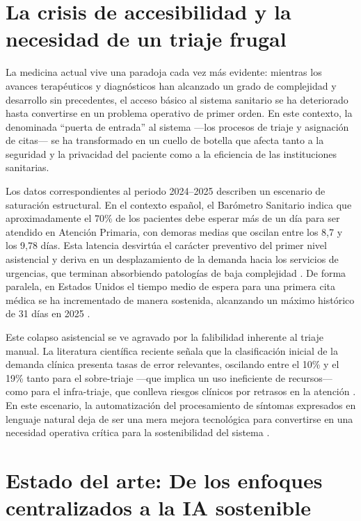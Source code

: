 
\section{La crisis de accesibilidad y la necesidad de un triaje frugal}

La medicina actual vive una paradoja cada vez más evidente: mientras los avances terapéuticos y diagnósticos han alcanzado un grado de complejidad y desarrollo sin precedentes, el acceso básico al sistema sanitario se ha deteriorado hasta convertirse en un problema operativo de primer orden. En este contexto, la denominada ``puerta de entrada'' al sistema ---los procesos de triaje y asignación de citas--- se ha transformado en un cuello de botella que afecta tanto a la seguridad y la privacidad del paciente como a la eficiencia de las instituciones sanitarias.

Los datos correspondientes al periodo 2024--2025 describen un escenario de saturación estructural. En el contexto español, el Barómetro Sanitario indica que aproximadamente el 70\% de los pacientes debe esperar más de un día para ser atendido en Atención Primaria, con demoras medias que oscilan entre los 8,7 y los 9,78 días. Esta latencia desvirtúa el carácter preventivo del primer nivel asistencial y deriva en un desplazamiento de la demanda hacia los servicios de urgencias, que terminan absorbiendo patologías de baja complejidad \cite{barometroSanitario2024,emergenciasSaturacionUrgencias2015,snsAPUnivadis2024}. De forma paralela, en Estados Unidos el tiempo medio de espera para una primera cita médica se ha incrementado de manera sostenida, alcanzando un máximo histórico de 31 días en 2025 \cite{waitTimeUS2025}.

Este colapso asistencial se ve agravado por la falibilidad inherente al triaje manual. La literatura científica reciente señala que la clasificación inicial de la demanda clínica presenta tasas de error relevantes, oscilando entre el 10\% y el 19\% tanto para el sobre-triaje ---que implica un uso ineficiente de recursos--- como para el infra-triaje, que conlleva riesgos clínicos por retrasos en la atención \cite{nguyen2022triageErrors}. En este escenario, la automatización del procesamiento de síntomas expresados en lenguaje natural deja de ser una mera mejora tecnológica para convertirse en una necesidad operativa crítica para la sostenibilidad del sistema \cite{automatedTriageDiva2020}.

\section{Estado del arte: De los enfoques centralizados a la IA sostenible}

